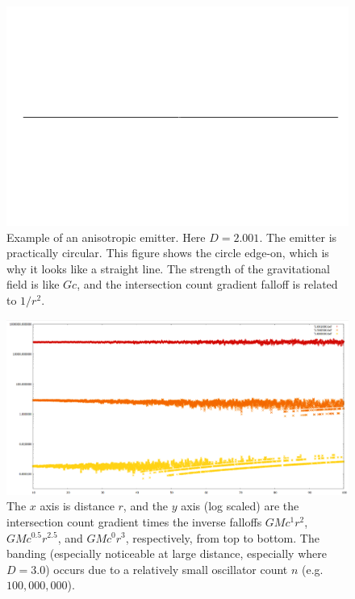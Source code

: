 \documentclass[12pt]{article}
\begin{document}
\begin{figure} 
\centering
  \includegraphics[width = 5 in]{2.png}
  \caption{
Example of an anisotropic emitter.
Here $D = 2.001$. 
The emitter is practically circular. 
This figure shows the circle edge-on, which is why it looks like a straight line.
The strength of the gravitational field is like $Gc$, and the intersection count gradient falloff is related to $1/r^2$.
}
\end{figure}













\begin{figure} 
\centering
  \includegraphics[width = 6 in]{multi_plot.png}
  \caption{
The $x$ axis is distance $r$, and the $y$ axis (log scaled) are the intersection count gradient times the inverse falloffs $GM c^{1} r^2$, $GM c^{0.5} r^{2.5}$, and $GM c^0 r^3$, respectively, from top to bottom.
The banding (especially noticeable at large distance, especially where $D = 3.0$) occurs due to a relatively small oscillator count $n$ (e.g. $100,000,000$).
}
\end{figure}
\end{document}
